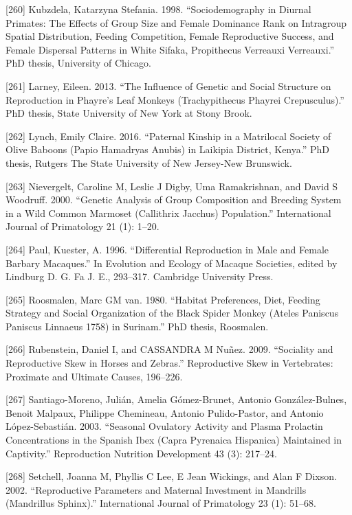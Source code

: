 \documentclass[
]{article}
\begin{document}
{[}260{]} Kubzdela, Katarzyna Stefania. 1998. ``Sociodemography in
Diurnal Primates: The Effects of Group Size and Female Dominance Rank on
Intragroup Spatial Distribution, Feeding Competition, Female
Reproductive Success, and Female Dispersal Patterns in White Sifaka,
Propithecus Verreauxi Verreauxi.'' PhD thesis, University of Chicago.

{[}261{]} Larney, Eileen. 2013. ``The Influence of Genetic and Social
Structure on Reproduction in Phayre's Leaf Monkeys (Trachypithecus
Phayrei Crepusculus).'' PhD thesis, State University of New York at
Stony Brook.

{[}262{]} Lynch, Emily Claire. 2016. ``Paternal Kinship in a Matrilocal
Society of Olive Baboons (Papio Hamadryas Anubis) in Laikipia District,
Kenya.'' PhD thesis, Rutgers The State University of New Jersey-New
Brunswick.

{[}263{]} Nievergelt, Caroline M, Leslie J Digby, Uma Ramakrishnan, and
David S Woodruff. 2000. ``Genetic Analysis of Group Composition and
Breeding System in a Wild Common Marmoset (Callithrix Jacchus)
Population.'' International Journal of Primatology 21 (1): 1--20.

{[}264{]} Paul, Kuester, A. 1996. ``Differential Reproduction in Male
and Female Barbary Macaques.'' In Evolution and Ecology of Macaque
Societies, edited by Lindburg D. G. Fa J. E., 293--317. Cambridge
University Press.

{[}265{]} Roosmalen, Marc GM van. 1980. ``Habitat Preferences, Diet,
Feeding Strategy and Social Organization of the Black Spider Monkey
(Ateles Paniscus Paniscus Linnaeus 1758) in Surinam.'' PhD thesis,
Roosmalen.

{[}266{]} Rubenstein, Daniel I, and CASSANDRA M Nuñez. 2009. ``Sociality
and Reproductive Skew in Horses and Zebras.'' Reproductive Skew in
Vertebrates: Proximate and Ultimate Causes, 196--226.

{[}267{]} Santiago-Moreno, Julián, Amelia Gómez-Brunet, Antonio
González-Bulnes, Benoit Malpaux, Philippe Chemineau, Antonio
Pulido-Pastor, and Antonio López-Sebastián. 2003. ``Seasonal Ovulatory
Activity and Plasma Prolactin Concentrations in the Spanish Ibex (Capra
Pyrenaica Hispanica) Maintained in Captivity.'' Reproduction Nutrition
Development 43 (3): 217--24.

{[}268{]} Setchell, Joanna M, Phyllis C Lee, E Jean Wickings, and Alan F
Dixson. 2002. ``Reproductive Parameters and Maternal Investment in
Mandrills (Mandrillus Sphinx).'' International Journal of Primatology 23
(1): 51--68.
\end{document}
